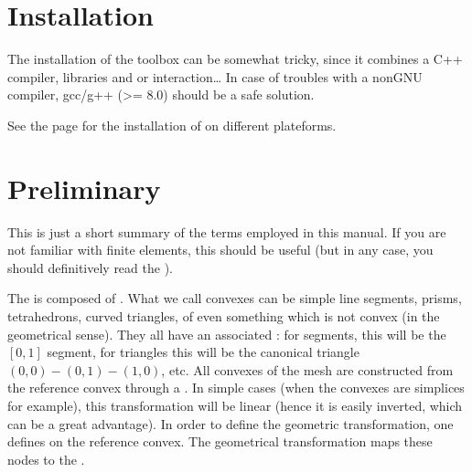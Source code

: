 \documentclass[a4paper,11pt,english]{sphinxmanual}
\begin{document}
\chapter{Installation}
\label{\detokenize{matlab_octave/install:installation}}\label{\detokenize{matlab_octave/install:mlab-install}}\label{\detokenize{matlab_octave/install::doc}}
The installation of the  toolbox can be somewhat tricky, since it combines a
C++ compiler, libraries and  or  interaction… In case of troubles with a
non\sphinxhyphen{}GNU compiler, gcc/g++ (\textgreater{}= 8.0) should be a safe solution.

See the  page for the installation of  on different plateforms.


\chapter{Preliminary}
\label{\detokenize{matlab_octave/pre:preliminary}}\label{\detokenize{matlab_octave/pre:mlab-pre}}\label{\detokenize{matlab_octave/pre::doc}}
This is just a short summary of the terms employed in this manual. If you are not
familiar with finite elements, this should be useful (but in any case, you should
definitively read the ).

The  is composed of . What we call convexes can be
simple line segments, prisms, tetrahedrons, curved triangles, of even something
which is not convex (in the geometrical sense). They all have an associated
: for segments, this will be the \([0,1]\) segment,
for triangles this will be the canonical triangle \((0,0)-(0,1)-(1,0)\), etc.
All convexes of the mesh are constructed from the reference convex through a
. In simple cases (when the convexes are
simplices for example), this transformation will be linear (hence it is easily
inverted, which can be a great advantage). In order to define the geometric
transformation, one defines  on the reference convex.
The geometrical transformation maps these nodes to the .
\end{document}
